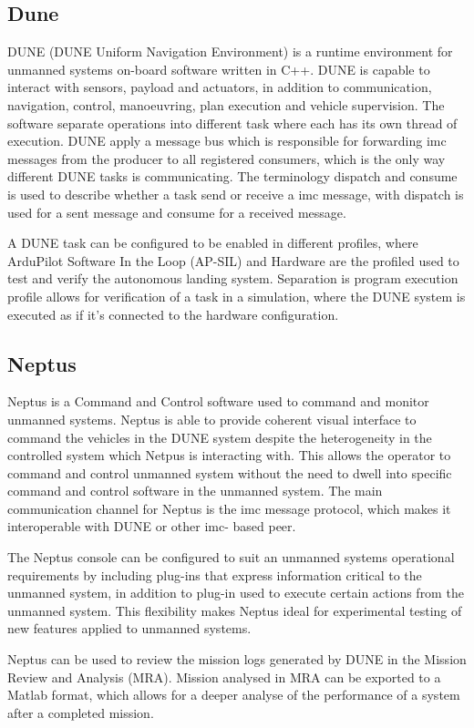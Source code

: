 \subsection{Dune}
DUNE (DUNE Uniform Navigation Environment) is a runtime environment for unmanned systems on-board software written in C++. DUNE is capable to interact with sensors, payload and actuators, in addition to communication, navigation, control, manoeuvring, plan execution and vehicle supervision. The software separate operations into different task where each has its own thread of execution. DUNE apply a message bus which is responsible for forwarding \gls{imc} messages from the producer to all registered consumers, which is the only way different DUNE tasks is communicating. The terminology dispatch and consume is used to describe whether a task send or receive a \gls{imc} message, with dispatch is used for a sent message and consume for a received message. 

A DUNE task can be configured to be enabled in different profiles, where ArduPilot Software In the Loop (AP-SIL) and Hardware are the profiled used to test and verify the autonomous landing system. Separation is program execution profile allows for verification of a task in a simulation, where the DUNE system is executed as if it's connected to the hardware configuration.
 
\subsection{Neptus}
Neptus is a Command and Control software used to command and monitor unmanned systems. Neptus is able to provide coherent visual interface to command the vehicles in the DUNE system despite the heterogeneity in the controlled system which Netpus is interacting with. This allows the operator to command and control unmanned system without the need to dwell into specific command and control software in the unmanned system. The main communication channel for Neptus is the \gls{imc} message protocol, which makes it interoperable with DUNE or other \gls{imc}- based peer.

The Neptus console can be configured to suit an unmanned systems operational requirements by including plug-ins that express information critical to the unmanned system, in addition to plug-in used to execute certain actions from the unmanned system. This flexibility makes Neptus ideal for experimental testing of new features  applied to unmanned systems.   

Neptus can be used to review the mission logs generated by DUNE in the Mission Review and Analysis (MRA). Mission analysed in MRA can be exported to a Matlab format, which allows for a deeper analyse of the performance of a system after a completed mission.
